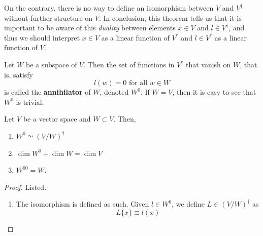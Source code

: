   On the contrary, there is no way to define an isomorphism between $V$ and $V^\dagger$ without further structure on $V$. In conclusion, this theorem tells us that it is important to be aware of this \textit{duality} between elements $x \in V$ and $l \in V^\dagger$, and thus we should interpret $x \in V$ as a linear function of $V^\dagger$ and $l \in V^\dagger$ as a linear function of $V$.

  \begin{definition}[Annihilator]
    Let $W$ be a subspace of $V$. Then the set of functions in $V^\dagger$ that vanish on $W$, that is, satisfy
    \begin{equation}
      l(w) = 0 \text{ for all } w \in W
    \end{equation}
    is called the \textbf{annihilator} of $W$, denoted $W^0$. If $W = V$, then it is easy to see that $W^0$ is trivial. 
  \end{definition}

  \begin{theorem}
    Let $V$ be a vector space and $W \subset V$. Then, 
    \begin{enumerate}
      \item $W^0 \simeq (V/W)^\dagger$
      \item $\dim W^0 + \dim W = \dim V$ 
      \item $W^{00} = W$. 
    \end{enumerate}
  \end{theorem}
  \begin{proof}
    Listed. 
    \begin{enumerate}
      \item The isomorphism is defined as such. Given $l \in W^0$, we define $L \in (V/W)^\dagger$ as 
        \begin{equation}
          L\{x\} \equiv l(x)
        \end{equation}
    \end{enumerate}
  \end{proof}

